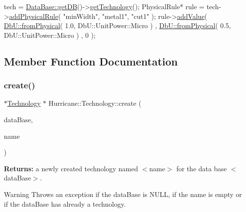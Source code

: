 \begin{DoxyCode}
tech = \mbox{\hyperlink{classHurricane_1_1DataBase_a53d0b9fcd06b73f3968c8f238f377a88}{DataBase::getDB}}()->\mbox{\hyperlink{classHurricane_1_1DataBase_a144480c54b0f9fbda57622ad6767ab8a}{getTechnology}}();
PhysicalRule* rule = tech->\mbox{\hyperlink{classHurricane_1_1Technology_a267e44b205b97ff46297d16ed278a5bc}{addPhysicalRule}}( \textcolor{stringliteral}{"minWidth"}, \textcolor{stringliteral}{"metal1"}, \textcolor{stringliteral}{"cut1"} );
rule->\mbox{\hyperlink{classHurricane_1_1PhysicalRule_ada08351fb24f36a63f4e3a3c524000a2}{addValue}}( \mbox{\hyperlink{group__DbUGroup_ga11d4dbd9134a19bda35cbacde1cb2769}{DbU::fromPhysical}}( 1.0, DbU::UnitPower::Micro )
              , \mbox{\hyperlink{group__DbUGroup_ga11d4dbd9134a19bda35cbacde1cb2769}{DbU::fromPhysical}}( 0.5, DbU::UnitPower::Micro )
              , 0 );
\end{DoxyCode}
 

\subsection{Member Function Documentation}
\mbox{\label{classHurricane_1_1Technology_a64670f0d48e9460342005df52f25c152}} 
\subsubsection{\texorpdfstring{create()}{create()}}
{\footnotesize\ttfamily $\ast$\mbox{\hyperlink{classHurricane_1_1Technology}{Technology}} $\ast$ Hurricane\+::\+Technology\+::create (\begin{DoxyParamCaption}\item[{\mbox{\hyperlink{classHurricane_1_1DataBase}{Data\+Base}} $\ast$}]{data\+Base,  }\item[{const \mbox{\hyperlink{classHurricane_1_1Name}{Name}} \&}]{name }\end{DoxyParamCaption})\hspace{0.3cm}{\ttfamily [static]}}

{\bfseries Returns\+:} a newly created technology named {\ttfamily $<$name$>$} for the data base {\ttfamily $<$data\+Base$>$}.

\begin{DoxyWarning}{Warning}
Throws an exception if the {\ttfamily data\+Base} is {\ttfamily N\+U\+LL}, if the name is empty or if the {\ttfamily data\+Base} has already a technology. 
\end{DoxyWarning}
\mbox{\label{classHurricane_1_1Technology_ae5590e455d35f76531a6feb0c0f111a2}} 
